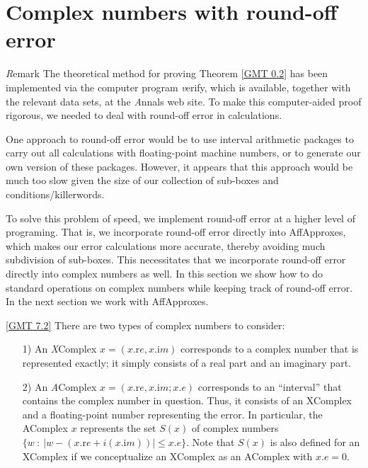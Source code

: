 \chapter{Complex numbers with round-off error}


{\textit Remark} \label{GMT 7.1}
The theoretical method for proving Theorem \ref{GMT 0.2}
has been implemented via the computer program {\textit verify}, which is available, together with the relevant data sets, at the {\textit Annals} web site.  To make this computer-aided proof rigorous, we needed to deal with round-off error in calculations.  

One approach to round-off error would be to use interval arithmetic packages to carry out all calculations with floating-point machine numbers, or to generate our own version of these packages.  
However, it appears that this approach
would be much too slow given the size of our collection of sub-boxes and conditions/killerwords.  

To solve this problem of speed, we implement round-off error at a higher level of programing.  That is, we incorporate round-off error directly
 into AffApproxes,  which makes our error calculations more accurate, thereby avoiding much subdivision of
sub-boxes. This necessitates that we incorporate round-off error directly into complex numbers as well. 
In this section we show how to do standard operations on complex numbers while keeping track of round-off error.
In the next section we work with  AffApproxes.

\begin{definition}{ {\textrm \ref{GMT 7.2}}}
There are two types of complex numbers to consider: 

\begin{itemize}
\item[1)]  An {\textit XComplex} $x = (x.{\mathrm re}, x.{\mathrm im})$ corresponds to a complex number that is represented exactly; it
simply consists of a real part and an imaginary part.

\item[2)]  An {\textit AComplex} $x = (x.{\mathrm re}, x.{\mathrm im}; x.e)$ corresponds to an ``interval'' that contains the complex number in
question.  Thus, it consists of an XComplex and a floating-point number representing the error.  In particular, the AComplex
$x$ represents the set $S(x)$ of complex numbers 
$\{w\ :\ |w - (x.{\mathrm re} + i (x.{\mathrm im}))| \le x.e\}$.  Note that $S(x)$ is also defined
for an XComplex if we conceptualize an XComplex as an AComplex with
$x.e = 0.$
\end{itemize}

\end{definition}

